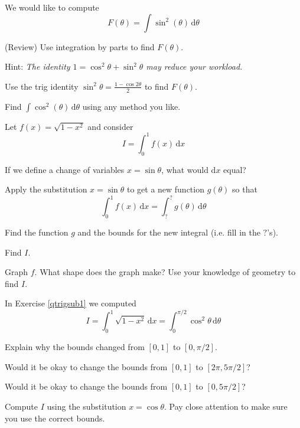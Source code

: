 \documentclass{workbook}
\begin{document}
\begin{slide}
	\question
	We would like to compute
	\[
		F(\theta) = \int \sin^2(\theta)\,\mathrm d \theta
	\]

	\begin{parts}
		\item (Review) Use integration by parts to find $F(\theta)$.

		Hint: \emph{The identity $1=\cos^2\theta +\sin^2\theta$ may reduce your workload.}

		\item Use the trig identity $\displaystyle\sin^2\theta = \frac{1-\cos 2\theta}{2}$
		to find $F(\theta)$.

		\item Find $\displaystyle \int \cos^2(\theta)\,\mathrm d \theta$ using any method you like.
	\end{parts}
\end{slide}

\begin{slide}
	\question
	\label{qtrigsub1}
	Let $f(x)=\sqrt{1-x^2}$ and consider
	\[
		I=\int_0^1 f(x)\,\mathrm d x
	\]

	\begin{parts}
		\item If we define a change of variables $x=\sin \theta$, what would
		$\mathrm d x$ equal?
		\item Apply the substitution $x=\sin\theta$ to get a new function
		$g(\theta)$ so that
		\[
			\int_0^1 f(x)\,\mathrm d x
			=
			\int_?^? g(\theta)\,\mathrm d \theta
		\]

		Find the function $g$ and the bounds for the new integral (i.e. fill in the $?$'s).

		\item Find $I$.

		\item Graph $f$. What shape does the graph make? Use your knowledge
		of geometry to find $I$.
	\end{parts}
\end{slide}

\begin{slide}
	\question
	In Exercise \ref{qtrigsub1} we computed
	\[
		I=\int_0^1 \sqrt{1-x^2}\,\mathrm d x = \int_0^{\pi/2} \cos^2\theta\,\mathrm d \theta
	\]

	\begin{parts}
		\item Explain why the bounds changed from $[0,1]$ to $[0,\pi/2]$.
		\item Would it be okay to change the bounds from $[0,1]$ to $[2\pi, 5\pi/2]$?
		\item Would it be okay to change the bounds from $[0,1]$ to $[0, 5\pi/2]$?
		\item Compute $I$ using the substitution $x=\cos\theta$. Pay close attention to
		make sure you use the correct bounds.
	\end{parts}
\end{slide}
\end{document}
